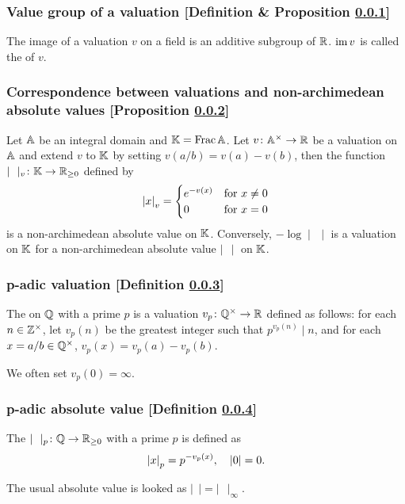 \subsubsection{Value group of a valuation [Definition \& Proposition \ref{value-group-of-a-valuation}]}\label{value-group-of-a-valuation}
The image of a valuation $v$ on a field is an additive subgroup of $\mathbb{R}$. $\operatorname{im} v$ is called the  of $v$.

\subsubsection{Correspondence between valuations and non-archimedean absolute values [Proposition \ref{correspondence-between-valuations-and-non-archimedean-absolute-values}]}\label{correspondence-between-valuations-and-non-archimedean-absolute-values}
Let $\mathbb{A}$ be an integral domain and $\mathbb{K} = \operatorname{Frac}\mathbb{A}$. Let $v\colon \mathbb{A}^\times \to \mathbb{R}$ be a valuation on $\mathbb{A}$ and extend $v$ to $\mathbb{K}$ by setting $v(a/b) = v(a) - v(b)$, then the function $\mid\ \ \mid_v \colon \mathbb{K} \to \mathbb{R}_{\ge 0}$ defined by
\[
\left| x \right|_v = \begin{cases}
 e^{-v(x)} & \text{for}\ x \neq 0 \\
 0 & \text{for}\ x = 0
 \end{cases}
 \] is a non-archimedean absolute value on $\mathbb{K}$. Conversely, $-\log \mid \,\ \mid$ is a valuation on $\mathbb{K}$ for a non-archimedean absolute value $\mid\ \ \mid$ on $\mathbb{K}$.


\subsubsection{p-adic valuation [Definition \ref{p-adic-valuation}]}\label{p-adic-valuation}
The  on $\mathbb{Q}$ with a prime $p$ is a valuation $v_p \colon \mathbb{Q}^\times \to \mathbb{R}$ defined as follows: for each $n \in \mathbb{Z}^\times$, let $v_p(n)$ be the greatest integer such that $p^{v_p(n)} \mid n$, and for each $x = a / b \in \mathbb{Q}^\times$, $v_p(x) = v_p(a) - v_p(b)$.

We often set $v_p(0) = \infty$.

\subsubsection{p-adic absolute value [Definition \ref{p-adic-absolute-value}]}\label{p-adic-absolute-value}
The  $\mid\ \ \mid_p \colon \mathbb{Q} \to \mathbb{R}_{\ge0}$ with a prime $p$ is defined as
\[
\left| x \right|_p = p^{-v_p(x)},\quad |0| = 0.
\]

The usual absolute value is looked as $\mid\ \ \mid = \mid\ \ \mid_\infty$.
